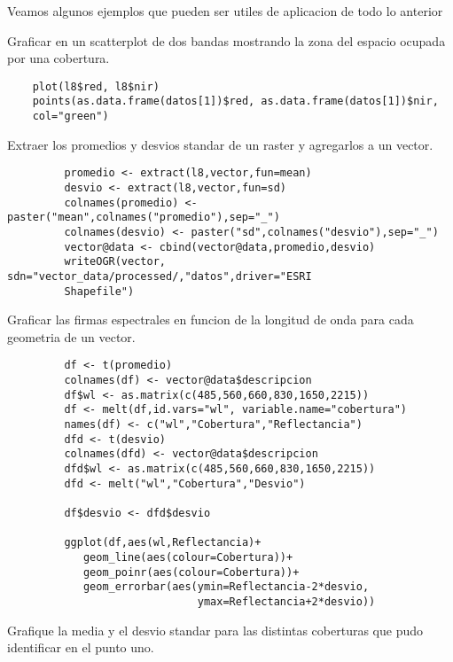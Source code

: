 Veamos algunos ejemplos que pueden ser utiles de aplicacion de todo lo anterior

\begin{exa}
    Graficar en un scatterplot de dos bandas mostrando la zona del espacio 
    ocupada por una cobertura.
 \begin{lstlisting}
    plot(l8$red, l8$nir)
    points(as.data.frame(datos[1])$red, as.data.frame(datos[1])$nir,
    col="green")
 \end{lstlisting}
\end{exa}

\begin{exa}
     Extraer los promedios y desvios standar de un raster y agregarlos a un
     vector.
     \begin{lstlisting}
         promedio <- extract(l8,vector,fun=mean)
         desvio <- extract(l8,vector,fun=sd)
         colnames(promedio) <- paster("mean",colnames("promedio"),sep="_")
         colnames(desvio) <- paster("sd",colnames("desvio"),sep="_")
         vector@data <- cbind(vector@data,promedio,desvio)
         writeOGR(vector, sdn="vector_data/processed/,"datos",driver="ESRI
         Shapefile")
     \end{lstlisting}
\end{exa}

\begin{exa}
     Graficar las firmas espectrales en funcion de la longitud de onda para cada
     geometria de un vector.
     \begin{lstlisting}
         df <- t(promedio)
         colnames(df) <- vector@data$descripcion
         df$wl <- as.matrix(c(485,560,660,830,1650,2215))
         df <- melt(df,id.vars="wl", variable.name="cobertura")
         names(df) <- c("wl","Cobertura","Reflectancia")
         dfd <- t(desvio)
         colnames(dfd) <- vector@data$descripcion
         dfd$wl <- as.matrix(c(485,560,660,830,1650,2215))
         dfd <- melt("wl","Cobertura","Desvio")

         df$desvio <- dfd$desvio

         ggplot(df,aes(wl,Reflectancia)+
            geom_line(aes(colour=Cobertura))+
            geom_poinr(aes(colour=Cobertura))+
            geom_errorbar(aes(ymin=Reflectancia-2*desvio,
                              ymax=Reflectancia+2*desvio))
     \end{lstlisting}
\end{exa}

\begin{act}
    Grafique la media y el desvio standar para las distintas coberturas que pudo
     identificar en el punto uno. 
\end{act}
